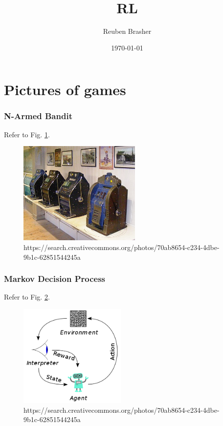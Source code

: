 \documentclass{beamer}
\title{RL}
\author{Reuben Brasher}
\date{\today}
\begin{document}
\frame{\titlepage}

\section[Outline]{}
\frame{\tableofcontents}

\section{Pictures of games}

\frame
{
   \frametitle{N-Armed Bandit}
   
   Refer to Fig. \ref{fig:narmed}.
   
   \begin{figure}[ht]
      \includegraphics[height=2in,keepaspectratio]{images/Slot_machines_at_Wookey_Hole_Caves.JPG}
      \caption{https://search.creativecommons.org/photos/70ab8654-c234-4dbe-9b1c-62851544245a} \label{fig:narmed}
   \end{figure}
}

\frame
{
   \frametitle{Markov Decision Process}
   
   Refer to Fig. \ref{fig:mdp}.
   
   \begin{figure}[ht]
      \includegraphics[height=2in,keepaspectratio]{images/Reinforcement_learning_diagram.svg.png}
      \caption{https://search.creativecommons.org/photos/70ab8654-c234-4dbe-9b1c-62851544245a} \label{fig:mdp}
   \end{figure}
}
\end{document}
